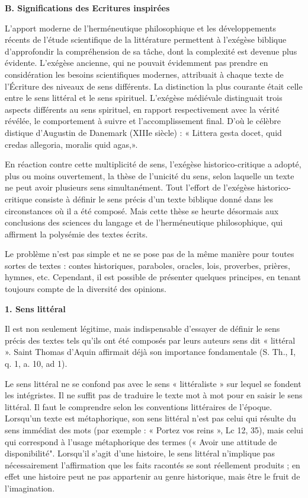   

\textbf{B. Significations des Ecritures inspirées  }

L'apport moderne de l'herméneutique philosophique et les développements récents de l'étude scientifique de la littérature permettent à l'exégèse biblique d'approfondir la compréhension de sa tâche, dont la complexité est devenue plus évidente. L'exégèse ancienne, qui ne pouvait évidemment pas prendre en considération les besoins scientifiques modernes, attribuait à chaque texte de l'Écriture des niveaux de sens différents. La distinction la plus courante était celle entre le sens littéral et le sens spirituel. L'exégèse médiévale distinguait trois aspects différents au sens spirituel, en rapport respectivement avec la vérité révélée, le comportement à suivre et l'accomplissement final. D'où le célèbre distique d'Augustin de Danemark (XIIIe siècle) : « Littera gesta docet, quid credas allegoria, moralis quid agas,».   

En réaction contre cette multiplicité de sens, l'exégèse historico-critique a adopté, plus ou moins ouvertement, la thèse de l'unicité du sens, selon laquelle un texte ne peut avoir plusieurs sens simultanément. Tout l'effort de l'exégèse historico-critique consiste à définir le sens précis d'un texte biblique donné dans les circonstances où il a été composé. Mais cette thèse se heurte désormais aux conclusions des sciences du langage et de l'herméneutique philosophique, qui affirment la polysémie des textes écrits.   

Le problème n'est pas simple et ne se pose pas de la même manière pour toutes sortes de textes : contes historiques, paraboles, oracles, lois, proverbes, prières, hymnes, etc. Cependant, il est possible de présenter quelques principes, en tenant toujours compte de la diversité des opinions.   

\textbf{1. Sens littéral  }

Il est non seulement légitime, mais indispensable d'essayer de définir le sens précis des textes tels qu'ils ont été composés par leurs auteurs sens dit « littéral ». Saint Thomas d'Aquin affirmait déjà son importance fondamentale (S. Th., I, q. 1, a. 10, ad 1).   

Le sens littéral ne se confond pas avec le sens « littéraliste » sur lequel se fondent les intégristes. Il ne suffit pas de traduire le texte mot à mot pour en saisir le sens littéral. Il faut le comprendre selon les conventions littéraires de l'époque. Lorsqu'un texte est métaphorique, son sens littéral n'est pas celui qui résulte du sens immédiat des mots (par exemple : « Portez vos reins », Lc 12, 35), mais celui qui correspond à l'usage métaphorique des termes (« Avoir une attitude de disponibilité". Lorsqu'il s'agit d'une histoire, le sens littéral n'implique pas nécessairement l'affirmation que les faits racontés se sont réellement produits ; en effet une histoire peut ne pas appartenir au genre historique, mais être le fruit de l'imagination.   

